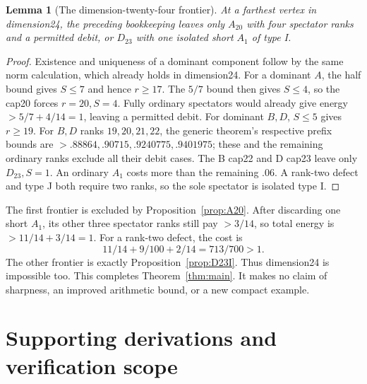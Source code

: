 \documentclass[11pt]{article}
\newtheorem{lemma}[theorem]{Lemma}
\theoremstyle{remark}
\begin{document}
\begin{lemma}[The dimension-twenty-four frontier]\label{lem:frontier24}
At a farthest vertex in dimension24, the preceding bookkeeping
leaves only \(A_{20}\) with four spectator ranks and a permitted
debit, or \(D_{23}\) with one isolated short \(A_1\) of type I.
\end{lemma}
\begin{proof}
Existence and uniqueness of a dominant component follow by the
same norm calculation, which already holds in dimension24.
For a dominant \(A\), the half bound gives \(S\le7\) and hence
\(r\ge17\). The \(5/7\) bound then gives \(S\le4\), so the
cap20 forces \(r=20,S=4\). Fully ordinary spectators would already
give energy \(>5/7+4/14=1\), leaving a permitted debit.
For dominant \(B,D\), \(S\le5\) gives \(r\ge19\).
For \(B,D\) ranks \(19,20,21,22\), the generic theorem's respective
prefix bounds are \(>.88864,.90715,.9240775,.9401975\);
these and the remaining ordinary ranks exclude all their debit
cases. The B cap22 and D cap23 leave only \(D_{23},S=1\).
An ordinary \(A_1\) costs more than the remaining \(.06\).
A rank-two defect and type J both require two ranks, so the
sole spectator is isolated type I.
\end{proof}

The first frontier is excluded by Proposition~\ref{prop:A20}.
After discarding one short \(A_1\), its other three spectator ranks
still pay \(>3/14\), so total energy is \(>11/14+3/14=1\).
For a rank-two defect, the cost is
\[
 11/14+9/100+2/14=713/700>1.
\]
The other frontier is exactly Proposition~\ref{prop:D23I}.
Thus dimension24 is impossible too. This completes
Theorem~\ref{thm:main}. It makes no claim of sharpness, an improved
arithmetic bound, or a new compact example.

\appendix
\section{Supporting derivations and verification scope}\label{app:map}
\end{document}
